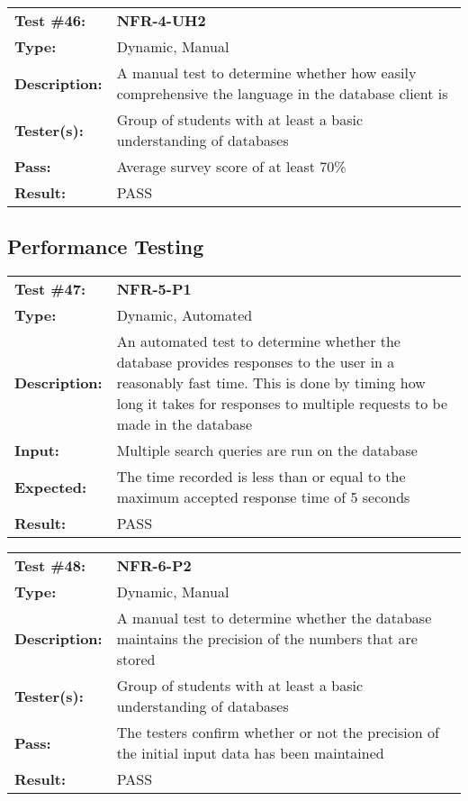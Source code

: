 \documentclass[12pt, titlepage]{article}
\begin{document}
\begin{mdframed}[linewidth=1pt]
\begin{tabularx}{\textwidth}{@{}p{3cm}X@{}}
{\bf Test \#46:} & {\bf NFR-4-UH2}\\[\baselineskip]
{\bf Type:} & Dynamic, Manual \\[0.5\baselineskip]
{\bf Description:} & A manual test to determine whether how easily comprehensive the language in the database client is \\[\baselineskip]
{\bf Tester(s):} & Group of students with at least a basic understanding of databases \\[\baselineskip]
{\bf Pass:} & Average survey score of at least 70\% \\[\baselineskip]
{\bf Result:} & PASS
\end{tabularx}
\end{mdframed}

\subsection{Performance Testing}

\begin{mdframed}[linewidth=1pt]
\begin{tabularx}{\textwidth}{@{}p{3cm}X@{}}
{\bf Test \#47:} & {\bf NFR-5-P1}\\[\baselineskip]
{\bf Type:} & Dynamic, Automated \\[0.5\baselineskip]
{\bf Description:} & An automated test to determine whether the database provides responses to the user in a reasonably fast time. This is done by timing how long it takes for responses to multiple requests to be made in the database \\[\baselineskip]
{\bf Input:} & Multiple search queries are run on the database  \\[\baselineskip]
{\bf Expected:} & The time recorded is less than or equal to the maximum accepted response time of 5 seconds \\[\baselineskip]
{\bf Result:} & PASS
\end{tabularx}
\end{mdframed}

\begin{mdframed}[linewidth=1pt]
\begin{tabularx}{\textwidth}{@{}p{3cm}X@{}}
{\bf Test \#48:} & {\bf NFR-6-P2}\\[\baselineskip]
{\bf Type:} & Dynamic, Manual \\[0.5\baselineskip]
{\bf Description:} & A manual test to determine whether the database maintains the precision of the numbers that are stored \\[\baselineskip]
{\bf Tester(s):} & Group of students with at least a basic understanding of databases \\[\baselineskip]
{\bf Pass:} & The testers confirm whether or not the precision of the initial input data has been maintained \\[\baselineskip]
{\bf Result:} & PASS
\end{tabularx}
\end{mdframed}
\end{document}
